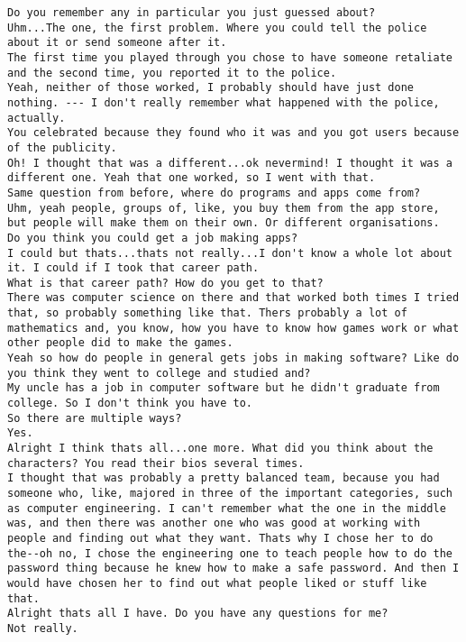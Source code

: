 \begin{lstlisting}
Do you remember any in particular you just guessed about?
Uhm...The one, the first problem. Where you could tell the police about it or send someone after it.
The first time you played through you chose to have someone retaliate and the second time, you reported it to the police.
Yeah, neither of those worked, I probably should have just done nothing. --- I don't really remember what happened with the police, actually.
You celebrated because they found who it was and you got users because of the publicity.
Oh! I thought that was a different...ok nevermind! I thought it was a different one. Yeah that one worked, so I went with that.
Same question from before, where do programs and apps come from?
Uhm, yeah people, groups of, like, you buy them from the app store, but people will make them on their own. Or different organisations. 
Do you think you could get a job making apps?
I could but thats...thats not really...I don't know a whole lot about it. I could if I took that career path.
What is that career path? How do you get to that?
There was computer science on there and that worked both times I tried that, so probably something like that. Thers probably a lot of mathematics and, you know, how you have to know how games work or what other people did to make the games.
Yeah so how do people in general gets jobs in making software? Like do you think they went to college and studied and?
My uncle has a job in computer software but he didn't graduate from college. So I don't think you have to.
So there are multiple ways?
Yes. 
Alright I think thats all...one more. What did you think about the characters? You read their bios several times. 
I thought that was probably a pretty balanced team, because you had someone who, like, majored in three of the important categories, such as computer engineering. I can't remember what the one in the middle was, and then there was another one who was good at working with people and finding out what they want. Thats why I chose her to do the--oh no, I chose the engineering one to teach people how to do the password thing because he knew how to make a safe password. And then I would have chosen her to find out what people liked or stuff like that.
Alright thats all I have. Do you have any questions for me?
Not really.
\end{lstlisting}

